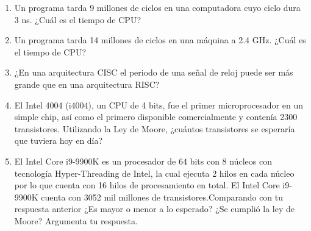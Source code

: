 \documentclass[a4paper,12pt]{article}
\begin{document}
\begin{enumerate}[label=\textcolor{teal}{\textbf{\arabic*.}}]
    \item Un programa tarda 9 millones de ciclos en una computadora cuyo ciclo dura 3 ns. ¿Cuál es el tiempo de CPU?

    \item Un programa tarda 14 millones de ciclos en una máquina a 2.4 GHz. ¿Cuál es el tiempo de CPU?

    \item ¿En una arquitectura CISC el periodo de una señal de reloj puede ser más grande que en una  arquitectura RISC?

    \item El Intel 4004 (i4004), un CPU de 4 bits, fue el primer microprocesador en un simple chip, así como el primero disponible comercialmente y contenía 2300 transistores. Utilizando la Ley de Moore, ¿cuántos transistores se esperaría que tuviera hoy en día?     

    \item El Intel Core i9-9900K es un procesador de 64 bits con 8 núcleos con tecnología Hyper-Threading de Intel, la cual ejecuta 2 hilos en cada núcleo por lo que cuenta con 16 hilos de procesamiento en total. El Intel Core i9-9900K cuenta con 3052 mil millones de transistores.Comparando con tu respuesta anterior ¿Es mayor o menor a lo esperado? ¿Se cumplió la ley de Moore? Argumenta tu respuesta.


            
    
\end{enumerate}


\nocite{*}
\printbibliography
\end{document}
